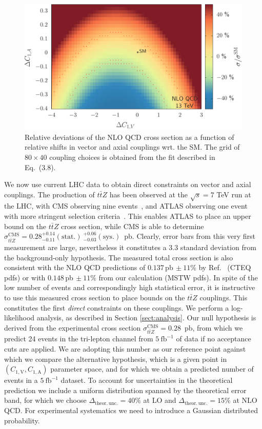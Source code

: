\documentclass{JHEP3}
\def\ttbZ{t\bar{t}Z}
\def\invfb {\mathrm{fb}^{-1}}
\def\ConeA{C_{1,\mathrm{A}}}
\def\ConeV{C_{1,\mathrm{V}}}
\begin{document}
\begin{figure}[t]
\centering
\includegraphics[scale=0.6]{LHC_53_SigmaNLO.pdf}
\caption{ \label{fig:viii} Relative deviations of the NLO QCD cross section as a function of relative shifts in vector and axial couplings wrt. the SM.
The grid of $ 80 \times 40 $ coupling choices is obtained from the fit described in Eq.~(3.8). }
\end{figure}



We now use current LHC data to obtain direct constraints on vector and axial couplings. The production of $\ttbZ$ has been observed at the $\sqrt{s}=7$ TeV run at the LHC, 
with CMS observing nine events~\cite{Chatrchyan:2013qca}, and ATLAS observing one event with more stringent selection criteria~\cite{ATLAS-CONF-2012-126}. 
This enables ATLAS to place an upper bound on the $\ttbZ$ cross section, 
while CMS is able to determine $\sigma_{\ttbZ}^{\mathrm{CMS}} = 0.28^{+0.14}_{-0.11}\mathrm{(stat.)}~^{+0.06}_{-0.03}\mathrm{(sys.)}$~pb. 
Clearly, error bars from this very first measurement are large, nevertheless it constitutes a 3.3 standard deviation from the background-only hypothesis.
The measured total cross section is also consistent with the NLO QCD predictions of $0.137\,$pb$\,\pm 11\%$ by Ref.~\cite{Garzelli:2011is} (CTEQ pdfs) 
or with $0.148\,$pb$\,\pm 11\%$ from our calculation (MSTW pdfs). 
In spite of the low number of events and correspondingly high statistical error, it is instructive to use this measured cross section to place bounds on the $\ttbZ$ couplings. 
This constitutes the first {\it direct} constraints on these couplings.
We perform a log-likelihood analysis, as described in Section \ref{sect:analysis}. 
Our null hypothesis is derived from the experimental cross section $\sigma_{\ttbZ}^{\mathrm{CMS}}=0.28$~pb, from which we predict 24 events in the tri-lepton channel 
from $5~\invfb$ of data if no acceptance cuts are applied. 
We are adopting this number as our reference point against which we compare the alternative hypothesis, 
which is a given point in $(\ConeV,\ConeA)$ parameter space, and for which we obtain a predicted number of events in a $5~\invfb$ dataset.
To account for uncertainties in the theoretical prediction we include a uniform distribution spanned by the theoretical error band, 
for which we choose $\Delta_\mathrm{theor.\,unc.} = 40\%$ at LO and $\Delta_\mathrm{theor.\,unc.} = 15\%$ at NLO QCD.
For experimental systematics we need to introduce a Gaussian distributed probability. 
\end{document}
